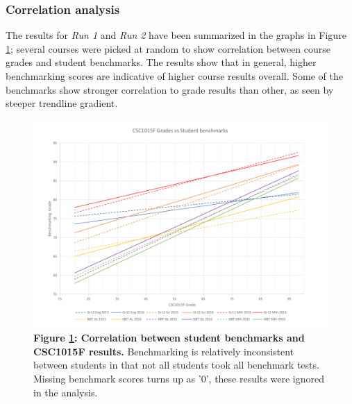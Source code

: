 \subsubsection{Correlation analysis}
The results for \textit{Run 1} and \textit{Run 2} have been summarized in the graphs in Figure \ref{CSC1015F-results}; several courses were picked at random to show correlation between course grades and student benchmarks. The results show that in general, higher benchmarking scores are indicative of higher course results overall. Some of the benchmarks show stronger correlation to grade results than other, as seen by steeper trendline gradient.

\begin{figure}[H]
    \centering
    \begin{mdframed}
        \centering
        \includegraphics[scale=0.55]{./resources/figures/run1.png}
    \end{mdframed}
    \caption[CSC1015 grade vs benchmark correlation]{\textbf{Figure \ref{CSC1015F-results}: Correlation between student benchmarks and CSC1015F results.} Benchmarking is relatively inconsistent between students in that not all students took all benchmark tests. Missing benchmark scores turns up as '0', these results were ignored in the analysis.}
    \label{CSC1015F-results}
\end{figure}